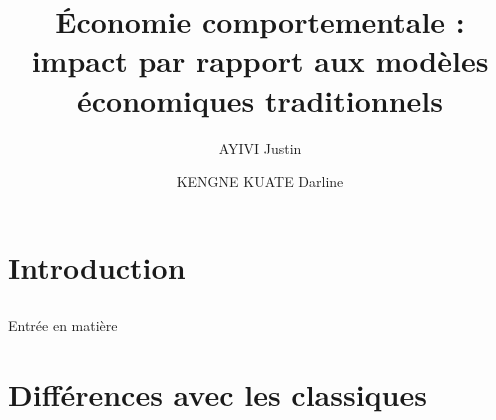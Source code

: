 \documentclass[serif]{beamer}
\author{ AYIVI Justin \and KENGNE KUATE Darline}
\title[Exposé d'Economie]{Économie comportementale : impact par rapport aux modèles économiques traditionnels} %
\institute{ENSAE}
\begin{document}
\begin{frame}{}
\transwipe[duration=0.3]
\maketitle
\end{frame}
\tableofcontents%

\section{Introduction}
\subsection{}
\begin{frame}{Entrée en matière}

\end{frame}

\section{Différences avec les classiques}
\end{document}
